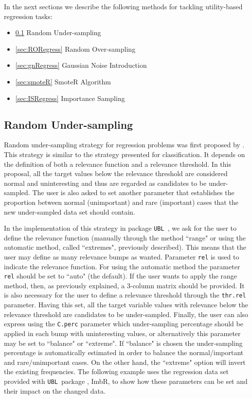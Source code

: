 \documentclass[10pt,a4paper]{article}\usepackage[]{graphicx}\usepackage[]{color}
\newcommand{\pUBL}{package \texttt{UBL}\ }
\newcommand{\UBLp}{\texttt{UBL}\ package  }
\begin{document}
In the next sections we describe the following methods for tackling utility-based regression tasks:
\begin{itemize}
\item \ref{sec:RURegress} Random Under-sampling
\item \ref{sec:RORegress} Random Over-sampling
\item \ref{sec:gnRegress} Gaussian Noise Introduction
\item \ref{sec:smoteR} SmoteR Algorithm
\item \ref{sec:ISRegress} Importance Sampling

\end{itemize}

\subsection{Random Under-sampling}\label{sec:RURegress}

Random under-sampling strategy for regression problems was first proposed by \cite{torgo2013smote}. This strategy is similar to the strategy presented for classification. It depends on the definition of both a relevance function and a relevance threshold. In this proposal, all the target values below the relevance threshold are considered normal and uninteresting and thus are regarded as candidates to be under-sampled. The user is also asked to set another parameter that establishes the proportion between normal (unimportant) and rare (important) cases that the new under-sampled data set should contain.


In the implementation of this strategy in \pUBL, we ask for the user to define the relevance function (manually through the method ``range" or using the automatic method, called ``extremes", previously described). This means that the user may define as many relevance bumps as wanted. Parameter \texttt{rel} is used to indicate the relevance function. For using the automatic method the parameter \texttt{rel} should be set to ``auto" (the default). If the user wants to apply the range method, then, as previously explained, a 3-column matrix should be provided. It is also necessary for the user to define a relevance threshold through the \texttt{thr.rel} parameter. Having this set, all the target variable values with relevance below the relevance threshold are candidates to be under-sampled. Finally, the user can also express using the \texttt{C.perc} parameter which under-sampling percentage should be applied in each bump with uninteresting values, or alternatively this parameter may be set to ``balance" or ``extreme". If ``balance" is chosen the under-sampling percentage is automatically estimated in order to balance the normal/important and rare/unimportant cases. On the other hand, the ``extreme" option will invert the existing frequencies. The following example uses the regression data set provided with \UBLp, ImbR, to show how these parameters can be set and their impact on the changed data.
\end{document}
